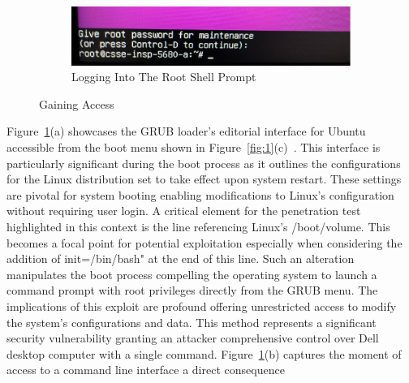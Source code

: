 \documentclass[manuscript,acmsmall,anonymous,review,screen,nonacm=true, authorversion=true]{acmart}
\begin{document}
\begin{figure}
\begin{subfigure}{.45\textwidth}
\end{subfigure}
\begin{subfigure}{.5\textwidth}
    \begin{centering}
    \includegraphics[scale=0.5]{pict/Picture11.png}
    \caption{Logging Into The Root Shell Prompt}
    \end{centering}
\end{subfigure}
\caption{Gaining Access}
    \label{fig:3}
\end{figure}

Figure~\ref{fig:3}(a) showcases the GRUB loader's editorial interface for Ubuntu accessible from the
boot menu shown in Figure~\ref{fig:1}(c)~\cite{linux,ubuntu,bash1,bash2}. This interface is particularly significant during the boot
process as it outlines the configurations for the Linux distribution set to take effect upon system
restart. These settings are pivotal for system booting enabling modifications to Linux's
configuration without requiring user login. A critical element for the penetration test
highlighted in this context is the line referencing Linux's /boot/volume. This becomes
a focal point for potential exploitation especially when considering the addition of
init=/bin/bash" at the end of this line. Such an alteration manipulates the boot process
compelling the operating system to launch a command prompt with root privileges directly from
the GRUB menu. The implications of this exploit are profound offering unrestricted
access to modify the system's configurations and data. This method represents a
significant security vulnerability granting an attacker comprehensive control over Dell
desktop computer with a single command.
Figure~\ref{fig:3}(b) captures the moment of access to a command line interface a direct consequence
\end{document}

